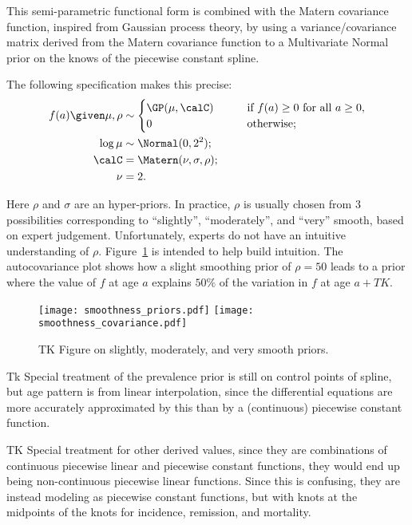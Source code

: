 This semi-parametric functional form is combined with the Matern
covariance function, inspired from Gaussian process theory, by using a
variance/covariance matrix derived from the Matern covariance function
to a Multivariate Normal prior on the knows of the piecewise constant
spline.

The following specification makes this precise:
\begin{align*}
f(a) \given \mu,\rho &\sim
\begin{cases} \GP(\mu, \calC) &\qquad\text{if } f(a) \geq 0 \text{ for all } a \geq 0,\\
0 &\qquad\text{otherwise;}\\
\end{cases}\\
\log \mu &\sim \Normal(0, 2^2);\\
\calC &= \Matern(\nu, \sigma, \rho);\\
\nu &= 2.
\end{align*}

Here $\rho$ and $\sigma$ are an hyper-priors.  In practice, $\rho$ is
usually chosen from $3$ possibilities corresponding to ``slightly'',
``moderately'', and ``very'' smooth, based on expert judgement.
Unfortunately, experts do not have an intuitive understanding of
$\rho$. Figure~\ref{theory-age_pattern_model-smoothness_priors} is
intended to help build intuition. The autocovariance plot shows how a
slight smoothing prior of $\rho=50$ leads to a prior where the value
of $f$ at age $a$ explains $50\%$ of the variation in $f$ at age
$a+TK$.  

\begin{figure}[h]
\begin{center}
\texttt{[image: smoothness\_priors.pdf]}
\texttt{[image: smoothness\_covariance.pdf]}
\end{center}
\caption{TK Figure on slightly, moderately, and very smooth priors.}
\label{theory-age_pattern_model-smoothness_priors}
\end{figure}

Tk Special treatment of the prevalence prior is still on control
points of spline, but age pattern is from linear interpolation, since
the differential equations are more accurately approximated by this
than by a (continuous) piecewise constant function.

TK Special treatment for other derived values, since they are
combinations of continuous piecewise linear and piecewise constant
functions, they would end up being non-continuous piecewise linear
functions.  Since this is confusing, they are instead modeling as
piecewise constant functions, but with knots at the midpoints of the
knots for incidence, remission, and mortality.

